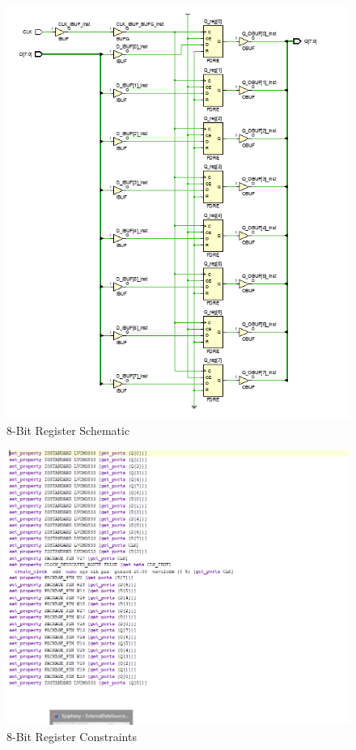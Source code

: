 \documentclass{article}
\begin{document}
\begin{figure}[h]
\begin{center}
\includegraphics[width=1\textwidth]{8BitRegisterSchematic.png} %
\caption{8-Bit Register Schematic}
\end{center}
\end{figure}


\begin{figure}[h]
\begin{center}
\includegraphics[width=1\textwidth]{8BitRegisterConstraints.png} %
\caption{8-Bit Register Constraints}
\end{center}
\end{figure}
\end{document}
